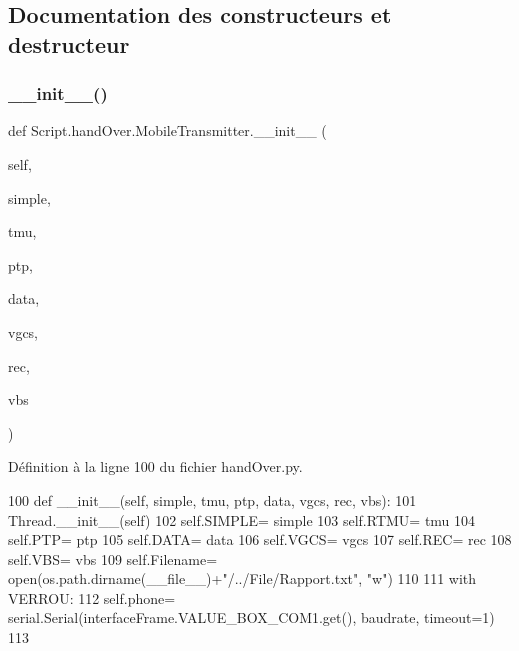 \subsection{Documentation des constructeurs et destructeur}
\mbox{\label{classScript_1_1handOver_1_1MobileTransmitter_a2d85711a89b1b99cadb9d759d1d6072f}} 
\subsubsection{\texorpdfstring{\+\_\+\+\_\+init\+\_\+\+\_\+()}{\_\_init\_\_()}}
{\footnotesize\ttfamily def Script.\+hand\+Over.\+Mobile\+Transmitter.\+\_\+\+\_\+init\+\_\+\+\_\+ (\begin{DoxyParamCaption}\item[{}]{self,  }\item[{}]{simple,  }\item[{}]{tmu,  }\item[{}]{ptp,  }\item[{}]{data,  }\item[{}]{vgcs,  }\item[{}]{rec,  }\item[{}]{vbs }\end{DoxyParamCaption})}



Définition à la ligne 100 du fichier hand\+Over.\+py.


\begin{DoxyCode}
100     \textcolor{keyword}{def }\_\_init\_\_(self, simple, tmu, ptp, data, vgcs, rec, vbs):
101         Thread.\_\_init\_\_(self)
102         self.SIMPLE= simple
103         self.RTMU= tmu
104         self.PTP= ptp
105         self.DATA= data
106         self.VGCS= vgcs
107         self.REC= rec
108         self.VBS= vbs
109         self.Filename= open(os.path.dirname(\_\_file\_\_)+\textcolor{stringliteral}{"/../File/Rapport.txt"}, \textcolor{stringliteral}{"w"})
110         
111         with VERROU:
112             self.phone= serial.Serial(interfaceFrame.VALUE\_BOX\_COM1.get(), baudrate, timeout=1)
113 
\end{DoxyCode}


